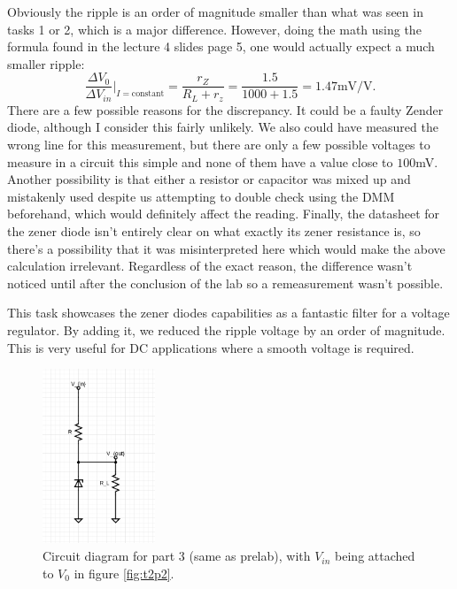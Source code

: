 \documentclass[letterpaper, reqno,11pt]{article}
\begin{document}
Obviously the ripple is an order of magnitude smaller than what was seen in tasks 1 or 2, which is a major difference. However, doing the math using the formula found in the lecture 4 slides page 5, one would actually expect a much smaller ripple:
\[
        \frac{\Delta V_0}{\Delta V_{in}}\bigg|_{I=\text{constant}}= \frac{r_Z}{R_L+r_z}= \frac{1.5}{1000+1.5}=1.47\text{mV/V}
.\]
There are a few possible reasons for the discrepancy. It could be a faulty Zender diode, although I consider this fairly unlikely. We also could have measured the wrong line for this measurement, but there are only a few possible voltages to measure in a circuit this simple and none of them have a value close to $100$mV. Another possibility is that either a resistor or capacitor was mixed up and mistakenly used despite us attempting to double check using the DMM beforehand, which would definitely affect the reading. Finally, the datasheet for the zener diode isn't entirely clear on what exactly its zener resistance is, so there's a possibility that it was misinterpreted here which would make the above calculation irrelevant. Regardless of the exact reason, the difference wasn't noticed until after the conclusion of the lab so a remeasurement wasn't possible.

This task showcases the zener diodes capabilities as a fantastic filter for a voltage regulator. By adding it, we reduced the ripple voltage by an order of magnitude. This is very useful for DC applications where a smooth voltage is required.

\begin{figure}[htpb]
        \centering
        \includegraphics[width=0.3\textwidth]{q4}
        \caption{Circuit diagram for part 3 (same as prelab), with $V_{in}$ being attached to $V_0$ in figure \ref{fig:t2p2}.}
        \label{fig:t3}
\end{figure}
\end{document}
